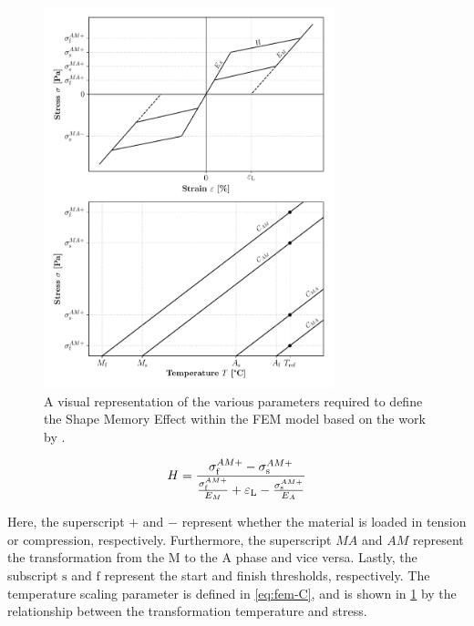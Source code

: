\begin{figure}[hbt!]
    \centering
    \includegraphics[width=0.75\textwidth]{images/chap2/fem-wp-graph.pdf}
    \caption[A visual representation of the various parameters required to define the Shape Memory Effect within the FEM model]{A visual representation of the various parameters required to define the Shape Memory Effect within the FEM model based on the work by \cite{jaberAnsysParametersShape2018}.}
    \label{fig:fem-wp-graph}
\end{figure}

\begin{equation}
    \label{eq:fem-h}
    H = \frac{\sigma_\mathrm{f}^{AM+}-\sigma_\mathrm{s}^{AM+}}{\frac{\sigma_\mathrm{f}^{AM+}}{E_M}+\varepsilon_\mathrm{L}-\frac{\sigma_\mathrm{s}^{AM+}}{E_A}}
\end{equation}

Here, the superscript $+$ and $-$ represent whether the material is loaded in tension or compression, respectively. Furthermore, the superscript $MA$ and $AM$ represent the transformation from the M to the A phase and vice versa. Lastly, the subscript $\mathrm{s}$ and $\mathrm{f}$ represent the start and finish thresholds, respectively. The temperature scaling parameter is defined in \cref{eq:fem-C}, and is shown in \cref{fig:fem-wp-graph} by the relationship between the transformation temperature and stress.

